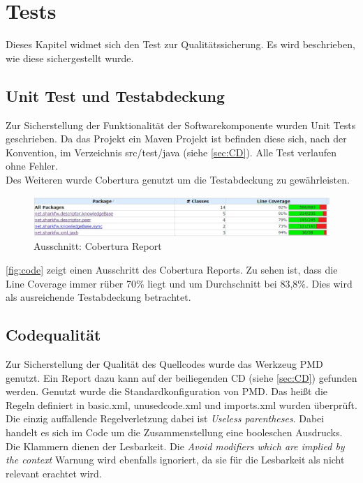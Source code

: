 \documentclass[a4paper]{article}
\begin{document}
	\newpage
	\section{Tests}
	
	Dieses Kapitel widmet sich den Test zur Qualitätssicherung. Es wird beschrieben,
	wie diese sichergestellt wurde.
	
	\subsection{Unit Test und Testabdeckung}
	
	Zur Sicherstellung der Funktionalität der Softwarekomponente wurden Unit Tests
	geschrieben. Da das Projekt ein Maven Projekt ist befinden diese sich, nach
	der Konvention, im Verzeichnis src/test/java (siehe \autoref{sec:CD}). Alle
	Test verlaufen ohne Fehler. \\
	
	Des Weiteren wurde Cobertura genutzt um die Testabdeckung zu gewährleisten. \\
	
  	\begin{figure}[H]
		\includegraphics[width=\linewidth]{../Bilder/code.jpg}
		\caption{Ausschnitt: Cobertura Report}
		\label{fig:code}
	\end{figure}	
	
	\autoref{fig:code} zeigt einen Ausschritt des Cobertura Reports. Zu sehen
	ist, dass die Line Coverage immer rüber 70\% liegt und um Durchschnitt bei 
	83,8\%. Dies wird als ausreichende Testabdeckung betrachtet.
	
	\subsection{Codequalität}
	\label{sec:pmd}
	
	Zur Sicherstellung der Qualität des Quellcodes wurde das Werkzeug PMD genutzt.
	Ein Report dazu kann auf der beiliegenden CD	
	(siehe \autoref{sec:CD}) gefunden werden.
	Genutzt wurde die Standardkonfiguration von PMD. Das heißt die Regeln definiert
	in basic.xml, unusedcode.xml und imports.xml wurden überprüft. Die einzig
	auffallende Regelverletzung dabei ist \emph{Useless parentheses}. Dabei
	handelt es sich im Code um die Zusammenstellung eine booleschen Ausdrucks.
	Die Klammern dienen der Lesbarkeit. Die \emph{Avoid modifiers which are implied
	by the context} Warnung wird ebenfalls ignoriert, da sie für die Lesbarkeit
	als nicht relevant erachtet wird.
	
\end{document}
